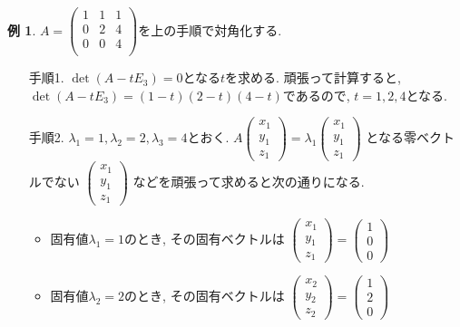 \documentclass[dvipdfmx,a4paper,11pt]{article}
\theoremstyle{definition}
\newtheorem{exa}[thm]{例}
\begin{document}
\begin{exa}
$A=\begin{pmatrix}
1& 1&1 \\
0&2&4 \\
0&0& 4 \\
\end{pmatrix}$を上の手順で対角化する.
\begin{enumerate}
	\setlength{\parskip}{0cm}
  	\setlength{\itemsep}{0pt} 
\item[手順1.] 
$\det (A - tE_3) =0$となる$t$を求める. 
頑張って計算すると, $\det (A - tE_3) = (1-t)(2-t)(4-t)$であるので, $t=1,2,4$となる.
\item[手順2.] $\lambda_1=1, \lambda_2=2, \lambda_3=4$とおく.
$
A\begin{pmatrix}
x_1\\  y_1\\ z_1
 \end{pmatrix}  
 = 
 \lambda_1
 \begin{pmatrix}
x_1\\  y_1\\ z_1
 \end{pmatrix}  
$
となる零ベクトルでない
$ \begin{pmatrix}
x_1\\  y_1\\ z_1
 \end{pmatrix}  
 $
 などを頑張って求めると次の通りになる.
 \begin{itemize}
 	\setlength{\parskip}{0cm}
  	\setlength{\itemsep}{0pt} 
 \item 固有値$\lambda_1=1$のとき, その固有ベクトルは
 $ \begin{pmatrix}
x_1\\  y_1\\ z_1
 \end{pmatrix}  
 =
  \begin{pmatrix}
1\\  0\\0
 \end{pmatrix}  
 $
  \item 固有値$\lambda_2=2$のとき, その固有ベクトルは
 $ \begin{pmatrix}
x_2\\  y_2\\ z_2
 \end{pmatrix}  
 =
  \begin{pmatrix}
1\\  2\\0
 \end{pmatrix}  
 $

\end{itemize}
\end{enumerate}
\end{exa}
\end{document}
